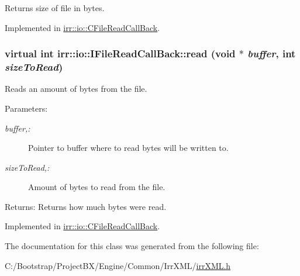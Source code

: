 Returns size of file in bytes. 



Implemented in \hyperlink{classirr_1_1io_1_1_c_file_read_call_back_c84d10241c07f1a8f744ffaad6683eef}{irr::io::CFileReadCallBack}.\hypertarget{classirr_1_1io_1_1_i_file_read_call_back_e8c57b8454078aa2acd39772a6aa4439}{
\subsubsection[{read}]{\setlength{\rightskip}{0pt plus 5cm}virtual int irr::io::IFileReadCallBack::read (void $\ast$ {\em buffer}, \/  int {\em sizeToRead})}}
\label{classirr_1_1io_1_1_i_file_read_call_back_e8c57b8454078aa2acd39772a6aa4439}


Reads an amount of bytes from the file. 

\begin{Desc}
\item[Parameters:]
\begin{description}
\item[{\em buffer,:}]Pointer to buffer where to read bytes will be written to. \item[{\em sizeToRead,:}]Amount of bytes to read from the file. \end{description}
\end{Desc}
\begin{Desc}
\item[Returns:]Returns how much bytes were read. \end{Desc}


Implemented in \hyperlink{classirr_1_1io_1_1_c_file_read_call_back_b2d4c4e10cd2b03af1173fbc25f87741}{irr::io::CFileReadCallBack}.

The documentation for this class was generated from the following file:\begin{CompactItemize}
\item 
C:/Bootstrap/ProjectBX/Engine/Common/IrrXML/\hyperlink{irr_x_m_l_8h}{irrXML.h}\end{CompactItemize}
